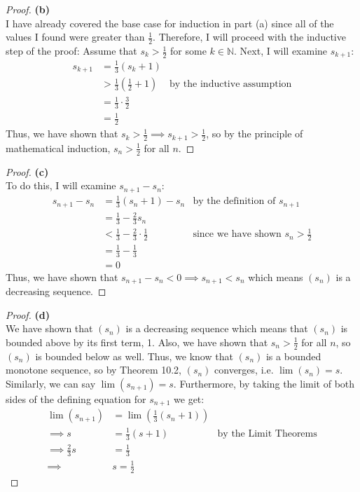\documentclass[10pt,a4paper]{article}
\theoremstyle{definition}
\begin{document}
\begin{proof}{\textbf{(b)}}
\\I have already covered the base case for induction in part (a) since all of the values I found were greater than $\frac{1}{2}$. Therefore, I will proceed with the inductive step of the proof: Assume that $s_k > \frac{1}{2}$ for some $k \in \mathbb{N}$. Next, I will examine $s_{k+1}$:
\begin{align*}
s_{k+1} &= \frac{1}{3}(s_k + 1)\\
&> \frac{1}{3}\left(\frac{1}{2} + 1\right) &\text{by the inductive assumption}\\
&= \frac{1}{3} \cdot \frac{3}{2}\\
&= \frac{1}{2}
\end{align*}
Thus, we have shown that $s_k > \frac{1}{2} \implies s_{k+1} > \frac{1}{2}$, so by the principle of mathematical induction, $s_n > \frac{1}{2}$ for all $n$. 
\end{proof}

\begin{proof}{\textbf{(c)}}
\\To do this, I will examine $s_{n+1} - s_n$:
\begin{align*}
s_{n+1} - s_n &= \frac{1}{3}(s_n + 1) - s_n &\text{by the definition of $s_{n+1}$}\\
&= \frac{1}{3} - \frac{2}{3}s_n\\
&< \frac{1}{3} - \frac{2}{3}\cdot \frac{1}{2} &\text{since we have shown $s_n > \frac{1}{2}$}\\
&= \frac{1}{3} - \frac{1}{3}\\
&= 0
\end{align*}
Thus, we have shown that $s_{n+1} - s_n < 0 \implies s_{n+1} < s_n$ which means $(s_n)$ is a decreasing sequence. 
\end{proof}

\begin{proof}{\textbf{(d)}}
\\We have shown that $(s_n)$ is a decreasing sequence which means that $(s_n)$ is bounded above by its first term, 1. Also, we have shown that $s_n > \frac{1}{2}$ for all $n$, so $(s_n)$ is bounded below as well. Thus, we know that $(s_n)$ is a bounded monotone sequence, so by Theorem 10.2, $(s_n)$ converges, i.e. $\lim(s_n) = s$. Similarly, we can say $\lim(s_{n+1}) = s$. Furthermore, by taking the limit of both sides of the defining equation for $s_{n+1}$ we get:
\begin{align*}
\lim(s_{n+1}) &= \lim\left(\frac{1}{3}(s_n + 1)\right)\\
\implies s &= \frac{1}{3}(s + 1) &\text{by the Limit Theorems}\\
\implies \frac{2}{3}s &= \frac{1}{3}\\
\implies &\boxed{s = \frac{1}{2}}
\end{align*}
\end{proof}
\end{document}
